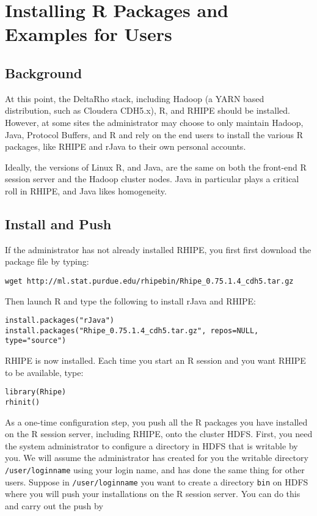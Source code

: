 \section{Installing R Packages and Examples for Users}
\subsection{Background}

At this point, the DeltaRho stack, including Hadoop (a YARN based
distribution, such as Cloudera CDH5.x), R, and RHIPE should be installed.
However, at some sites the administrator may choose to only maintain
Hadoop, Java, Protocol Buffers, and R and rely on the end users to
install the various R packages, like RHIPE and rJava to their own
personal accounts.

Ideally, the versions of Linux R, and Java, are the same on both the
front-end R session server and the Hadoop cluster nodes.  Java in particular
plays a critical roll in RHIPE, and Java likes homogeneity.

\subsection{Install and Push}
If the administrator has not already installed RHIPE, you first
first download the package file by typing:

\begin{verbatim}
wget http://ml.stat.purdue.edu/rhipebin/Rhipe_0.75.1.4_cdh5.tar.gz
\end{verbatim}

Then launch R and type the following to install rJava and RHIPE:

\begin{verbatim}
install.packages("rJava")
install.packages("Rhipe_0.75.1.4_cdh5.tar.gz", repos=NULL, type="source")
\end{verbatim}

RHIPE is now installed. Each time you start an R session and you
want RHIPE to be available, type:

\begin{verbatim}
library(Rhipe)
rhinit()
\end{verbatim}

As a one-time configuration step, you push all the R packages you have
installed on the R session server, including RHIPE, onto the cluster HDFS.
First, you need the system administrator to configure a directory in HDFS
that is writable by you. We will assume the administrator has created
for you the writable directory \texttt{/user/loginname} using your
login name, and has done the same thing for other users.  Suppose in
\texttt{/user/loginname} you want to create a directory \texttt{bin}
on HDFS where you will push your installations on the R session
server. You can do this and carry out the push by

